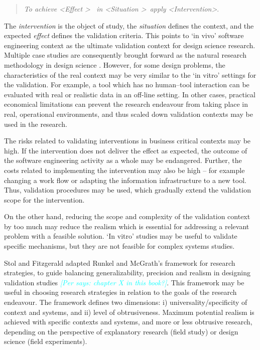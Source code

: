 \documentclass[graybox]{svmult}
\newcommand{\per}[1]{\textcolor{cyan}{{\it [Per says: #1]}}}
\newcommand{\per}[1]{}
\begin{document}
\begin{quote}{\emph{To achieve \textless Effect \textgreater ~ in \textless Situation \textgreater~apply \textless Intervention\textgreater}.} 
\end{quote} 
The \emph{intervention} is the object of study, the \emph{situation} defines the context, and the expected \emph{effect} defines the validation criteria. This points to `in vivo' software engineering context as the ultimate validation context for design science research. Multiple case studies are consequently brought forward as the natural research methodology in design science \cite{van_aken_management_2004}. However, for some design problems, the characteristics of the real context may be very similar to the `in vitro' settings for the validation. For example, a tool which has no human--tool interaction can be evaluated with real or realistic data in an off-line setting. In other cases, practical economical limitations can prevent the research endeavour from taking place in real, operational environments, and thus scaled down validation contexts may be used in the research. 

The risks related to validating interventions in business critical contexts may be high. If the intervention does not deliver the effect as expected, the outcome of the software engineering activity as a whole may be endangered. Further, the costs related to implementing the intervention may also be high -- for example changing a work flow or adapting the information infrastructure to a new tool. Thus, validation procedures may be used, which gradually extend the validation scope for the intervention.

On the other hand, reducing the scope and complexity of the validation context by too much may reduce the realism which is essential for addressing a relevant problem with a feasible solution. `In vitro' studies may be useful to validate specific mechanisms, but they are not feasible for complex systems studies.  

Stol and Fitzgerald adapted Runkel and McGrath's framework for research strategies, to guide balancing generalizability, precision and realism in designing validation studies \cite{StolABC18}\per{chapter X in this book?}. This framework may be useful in choosing research strategies in relation to the goals of the research endeavour. The framework defines two dimensions: i) universality/specificity of context and systems, and ii) level of obtrusiveness. Maximum potential realism is achieved with specific contexts and systems, and more or less obtrusive research, depending on the perspective of explanatory research (field study) or design science (field experiments).  
\end{document}

